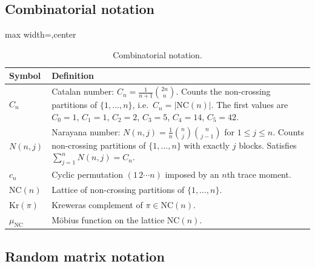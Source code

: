 \documentclass[11pt,letterpaper]{article}
\theoremstyle{plain}
\theoremstyle{definition}
\theoremstyle{remark}
\begin{document}
\subsection{Combinatorial notation}

\begin{table}[ht]
\centering
\renewcommand{\arraystretch}{1.35}
\begin{adjustbox}{max width=\textwidth,center}
\begin{tabular}{@{}lp{10.6cm}@{}}
\hline
\textbf{Symbol} & \textbf{Definition} \\
\hline
$C_n$ &
  Catalan number: $C_n = \frac{1}{n+1}\binom{2n}{n}$.  Counts the non-crossing
  partitions of $\{1,\dots,n\}$, i.e.\ $C_n = |\mathrm{NC}(n)|$.  The first
  values are $C_0 = 1$, $C_1 = 1$, $C_2 = 2$, $C_3 = 5$, $C_4 = 14$,
  $C_5 = 42$. \\
$N(n,j)$ &
  Narayana number: $N(n,j) = \frac{1}{n}\binom{n}{j}\binom{n}{j-1}$
  for $1 \le j \le n$.
  Counts non-crossing partitions of $\{1,\dots,n\}$ with exactly $j$ blocks.
  Satisfies $\sum_{j=1}^{n} N(n,j) = C_n$. \\
$c_n$ &
  Cyclic permutation $(1\,2\cdots n)$ imposed by an $n$th trace moment. \\
$\mathrm{NC}(n)$ &
  Lattice of non-crossing partitions of $\{1,\dots,n\}$. \\
$\mathrm{Kr}(\pi)$ &
  Kreweras complement of $\pi \in \mathrm{NC}(n)$. \\
$\mu_{\mathrm{NC}}$ &
  M\"obius function on the lattice $\mathrm{NC}(n)$. \\
\hline
\end{tabular}
\end{adjustbox}
\caption{Combinatorial notation.}
\label{tab16:combinatorial_notation}
\end{table}

\subsection{Random matrix notation}
\end{document}
